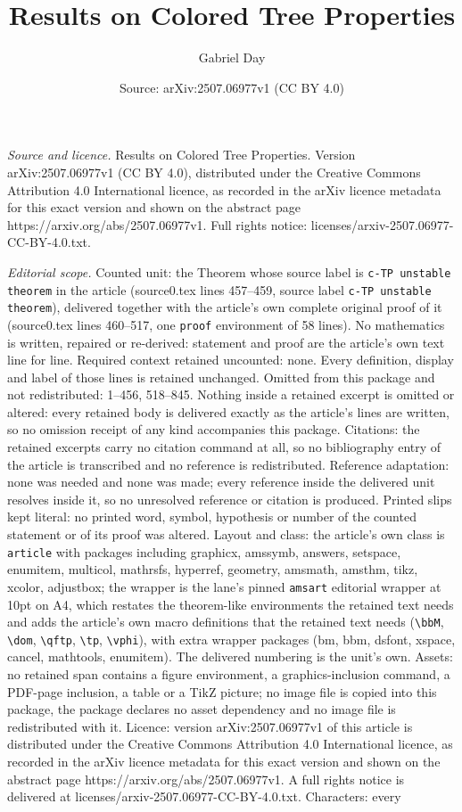 \documentclass[10pt,a4paper]{amsart}
\title[Results on Colored Tree Properties]{Results on Colored Tree Properties}
\author{Gabriel Day}
\date{Source: arXiv:2507.06977v1 (CC BY 4.0)}
\begin{document}
\maketitle

\noindent\emph{Source and licence.} Results on Colored Tree Properties. Version arXiv:2507.06977v1 (CC BY 4.0), distributed under the Creative Commons Attribution 4.0 International licence, as recorded in the arXiv licence metadata for this exact version and shown on the abstract page https://arxiv.org/abs/2507.06977v1. Full rights notice: licenses/arxiv-2507.06977-CC-BY-4.0.txt.\par\smallskip

\noindent\textit{Editorial scope.} Counted unit: the Theorem whose source label is \texttt{c-TP unstable theorem} in the article (source0.tex lines 457--459, source label \texttt{c-TP unstable theorem}), delivered together with the article's own complete original proof of it (source0.tex lines 460--517, one \texttt{proof} environment of 58 lines). No mathematics is written, repaired or re-derived: statement and proof are the article's own text line for line. Required context retained uncounted: none. Every definition, display and label of those lines is retained unchanged. Omitted from this package and not redistributed: 1--456, 518--845. Nothing inside a retained excerpt is omitted or altered: every retained body is delivered exactly as the article's lines are written, so no omission receipt of any kind accompanies this package. Citations: the retained excerpts carry no citation command at all, so no bibliography entry of the article is transcribed and no reference is redistributed. Reference adaptation: none was needed and none was made; every reference inside the delivered unit resolves inside it, so no unresolved reference or citation is produced. Printed slips kept literal: no printed word, symbol, hypothesis or number of the counted statement or of its proof was altered. Layout and class: the article's own class is \texttt{article} with packages including graphicx, amssymb, answers, setspace, enumitem, multicol, mathrsfs, hyperref, geometry, amsmath, amsthm, tikz, xcolor, adjustbox; the wrapper is the lane's pinned \texttt{amsart} editorial wrapper at 10pt on A4, which restates the theorem-like environments the retained text needs and adds the article's own macro definitions that the retained text needs (\texttt{\textbackslash bbM}, \texttt{\textbackslash dom}, \texttt{\textbackslash qftp}, \texttt{\textbackslash tp}, \texttt{\textbackslash vphi}), with extra wrapper packages (bm, bbm, dsfont, xspace, cancel, mathtools, enumitem). The delivered numbering is the unit's own. Assets: no retained span contains a figure environment, a graphics-inclusion command, a PDF-page inclusion, a table or a TikZ picture; no image file is copied into this package, the package declares no asset dependency and no image file is redistributed with it. Licence: version arXiv:2507.06977v1 of this article is distributed under the Creative Commons Attribution 4.0 International licence, as recorded in the arXiv licence metadata for this exact version and shown on the abstract page https://arxiv.org/abs/2507.06977v1. A full rights notice is delivered at licenses/arxiv-2507.06977-CC-BY-4.0.txt. Characters: every 
\end{document}
